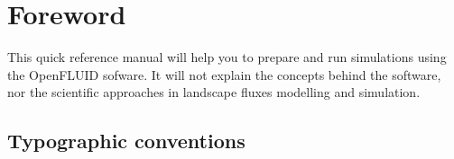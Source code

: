 \chapter*{Foreword}

This quick reference manual will help you to prepare and run simulations using
the OpenFLUID sofware. It will not explain the concepts behind the software, nor the
scientific approaches in landscape fluxes modelling and simulation. 

\section*{Typographic conventions}




